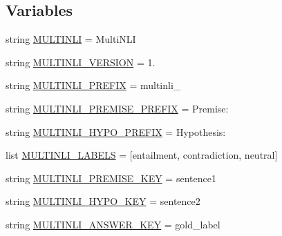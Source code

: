 \subsection*{Variables}
\begin{DoxyCompactItemize}
\item 
string \hyperlink{namespaceparlai_1_1tasks_1_1multinli_1_1agents_a17d5fe66828b69764ccb493aa6432c49}{M\+U\+L\+T\+I\+N\+LI} = \textquotesingle{}Multi\+N\+LI\textquotesingle{}
\item 
string \hyperlink{namespaceparlai_1_1tasks_1_1multinli_1_1agents_a9fb64106ee985b7d8dabbc7165c3e249}{M\+U\+L\+T\+I\+N\+L\+I\+\_\+\+V\+E\+R\+S\+I\+ON} = \textquotesingle{}1.\textquotesingle{}
\item 
string \hyperlink{namespaceparlai_1_1tasks_1_1multinli_1_1agents_a4255c9c33dc2c030473b8704194468c3}{M\+U\+L\+T\+I\+N\+L\+I\+\_\+\+P\+R\+E\+F\+IX} = \textquotesingle{}multinli\+\_\+\textquotesingle{}
\item 
string \hyperlink{namespaceparlai_1_1tasks_1_1multinli_1_1agents_ab345207f5db4f15595007c3df0f355d9}{M\+U\+L\+T\+I\+N\+L\+I\+\_\+\+P\+R\+E\+M\+I\+S\+E\+\_\+\+P\+R\+E\+F\+IX} = \textquotesingle{}Premise\+: \textquotesingle{}
\item 
string \hyperlink{namespaceparlai_1_1tasks_1_1multinli_1_1agents_ac177130525d37cb8fe05c434f73bbb9c}{M\+U\+L\+T\+I\+N\+L\+I\+\_\+\+H\+Y\+P\+O\+\_\+\+P\+R\+E\+F\+IX} = \textquotesingle{}Hypothesis\+: \textquotesingle{}
\item 
list \hyperlink{namespaceparlai_1_1tasks_1_1multinli_1_1agents_ad167c8774f5dd00b300ca88432ed31b2}{M\+U\+L\+T\+I\+N\+L\+I\+\_\+\+L\+A\+B\+E\+LS} = \mbox{[}\textquotesingle{}entailment\textquotesingle{}, \textquotesingle{}contradiction\textquotesingle{}, \textquotesingle{}neutral\textquotesingle{}\mbox{]}
\item 
string \hyperlink{namespaceparlai_1_1tasks_1_1multinli_1_1agents_a3bd404516bf2a240cb0e00d6f582e4f0}{M\+U\+L\+T\+I\+N\+L\+I\+\_\+\+P\+R\+E\+M\+I\+S\+E\+\_\+\+K\+EY} = \textquotesingle{}sentence1\textquotesingle{}
\item 
string \hyperlink{namespaceparlai_1_1tasks_1_1multinli_1_1agents_a9999d7d2edf091ff75ef0278c8ab72e9}{M\+U\+L\+T\+I\+N\+L\+I\+\_\+\+H\+Y\+P\+O\+\_\+\+K\+EY} = \textquotesingle{}sentence2\textquotesingle{}
\item 
string \hyperlink{namespaceparlai_1_1tasks_1_1multinli_1_1agents_ae07bc97ac7b5dc6cb0b461b5c3268d87}{M\+U\+L\+T\+I\+N\+L\+I\+\_\+\+A\+N\+S\+W\+E\+R\+\_\+\+K\+EY} = \textquotesingle{}gold\+\_\+label\textquotesingle{}
\end{DoxyCompactItemize}


